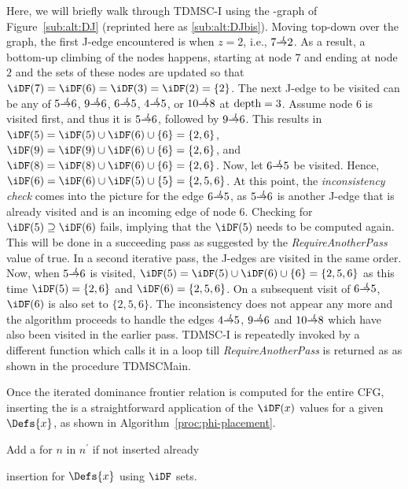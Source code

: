 {Here, we will briefly walk through TDMSC-I using the \DJ-graph of Figure~\ref{sub:alt:DJ} (reprinted here as \ref{sub:alt:DJbis}). 
Moving top-down over the graph, the first J-edge encountered is when $z=2$, i.e., $7 \st{J} 2$. 
As a result, a bottom-up climbing of the nodes happens, starting at node $7$ and ending at node $2$ and the \iDF sets of these nodes are updated so that $\iDF(7) = \iDF(6) = \iDF(3) = \iDF(2) = \{2\}$. 
The next J-edge to be visited can be any of $5 \st{J} 6$, $9 \st{J} 6$, $6 \st{J} 5$, $4 \st{J} 5$, or $10 \st{J} 8$ at $\textrm{depth} = 3$. 
Assume node 6 is visited first, and thus it is $5 \st{J} 6$, followed by $9 \st{J} 6$. 
This results in $\iDF(5) = \iDF(5) \cup \iDF(6) \cup \{6\} = \{2,6\}$, $\iDF(9) = \iDF(9) \cup \iDF(6) \cup \{6\} = \{2,6\}$, and $\iDF(8) = \iDF(8) \cup \iDF(6) \cup \{6\} = \{2,6\}$. 
Now, let $6 \st{J} 5$ be visited. 
Hence, $\iDF(6) = \iDF(6) \cup \iDF(5) \cup \{5\} = \{2,5,6\}$. 
At this point, the \emph{inconsistency check} comes into the picture for the edge $6 \st{J} 5$, as $5 \st{J} 6$ is another J-edge that is already visited and is an incoming edge of node $6$. 
Checking for $\iDF(5) \supseteq \iDF(6)$ fails, implying that the $\iDF(5)$ needs to be computed again. 
This will be done in a succeeding pass as suggested by the \textit{RequireAnotherPass} value of true. 
In a second iterative pass, the J-edges are visited in the same order. 
Now, when $5 \st{J} 6$ is visited, $\iDF(5) = \iDF(5) \cup \iDF(6) \cup \{6\} = \{2,5,6\}$ as this time $\iDF(5) = \{2,6\}$ and $\iDF(6) = \{2,5,6\}$. 
On a subsequent visit of $6 \st{J} 5$, $\iDF(6)$ is also set to $\{2,5,6\}$. 
The inconsistency does not appear any more and the algorithm proceeds to handle the edges $4 \st{J} 5$, $9 \st{J} 6$ and $10 \st{J} 8$ which have also been visited in the earlier pass. 
TDMSC-I is repeatedly invoked by a different function which calls it in a loop till \textit{RequireAnotherPass} is returned as \false as shown in the procedure TDMSCMain.

Once the iterated dominance frontier relation is computed for the entire CFG, inserting the \phifuns is a straightforward application of the $\iDF(x)$ values for a given $\Defs{x}$, as shown in Algorithm~\ref{proc:phi-placement}.

\begin{algorithm}
   {
     {
      Add a \phifun for $n$ in $n^{'}$ if not inserted already
    }
  }
  \caption{\phifun insertion for $\Defs{x}$ using $\iDF$ sets.}
  \label{proc:phi-placement}


\end{algorithm}}
